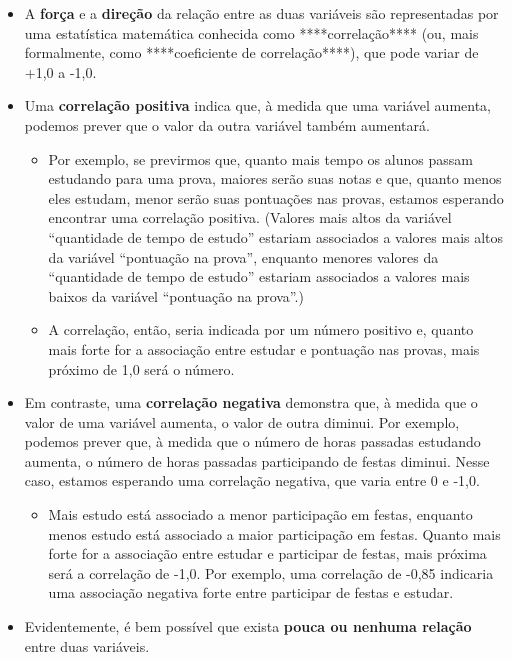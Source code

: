 \documentclass[
]{book}
\providecommand{\tightlist}{%
  \setlength{\itemsep}{0pt}\setlength{\parskip}{0pt}}
\begin{document}
\begin{itemize}
\tightlist
\item
  A \textbf{força} e a \textbf{direção} da relação entre as duas
  variáveis são representadas por uma estatística matemática conhecida
  como ****correlação**** (ou, mais formalmente, como ****coeficiente de
  correlação****), que pode variar de +1,0 a -1,0.
\item
  Uma \textbf{correlação positiva} indica que, à medida que uma variável
  aumenta, podemos prever que o valor da outra variável também
  aumentará.

  \begin{itemize}
  \tightlist
  \item
    Por exemplo, se previrmos que, quanto mais tempo os alunos passam
    estudando para uma prova, maiores serão suas notas e que, quanto
    menos eles estudam, menor serão suas pontuações nas provas, estamos
    esperando encontrar uma correlação positiva. (Valores mais altos da
    variável ``quantidade de tempo de estudo'' estariam associados a
    valores mais altos da variável ``pontuação na prova'', enquanto
    menores valores da ``quantidade de tempo de estudo'' estariam
    associados a valores mais baixos da variável ``pontuação na
    prova''.)
  \item
    A correlação, então, seria indicada por um número positivo e, quanto
    mais forte for a associação entre estudar e pontuação nas provas,
    mais próximo de 1,0 será o número.
  \end{itemize}
\item
  Em contraste, uma \textbf{correlação negativa} demonstra que, à medida
  que o valor de uma variável aumenta, o valor de outra diminui. Por
  exemplo, podemos prever que, à medida que o número de horas passadas
  estudando aumenta, o número de horas passadas participando de festas
  diminui. Nesse caso, estamos esperando uma correlação negativa, que
  varia entre 0 e -1,0.

  \begin{itemize}
  \tightlist
  \item
    Mais estudo está associado a menor participação em festas, enquanto
    menos estudo está associado a maior participação em festas. Quanto
    mais forte for a associação entre estudar e participar de festas,
    mais próxima será a correlação de -1,0. Por exemplo, uma correlação
    de -0,85 indicaria uma associação negativa forte entre participar de
    festas e estudar.
  \end{itemize}
\item
  Evidentemente, é bem possível que exista \textbf{pouca ou nenhuma
  relação} entre duas variáveis.


\end{itemize}
\end{document}
